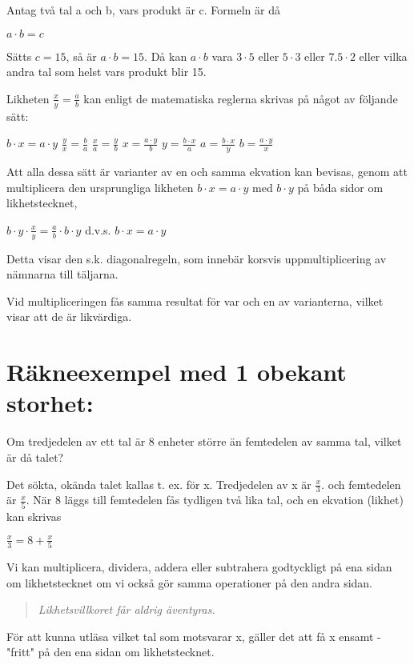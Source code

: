 Antag två tal a och b, vars produkt är c.
Formeln är då

\(a \cdot b = c\)

Sätts \(c = 15\), så är \(a \cdot b = 15\). Då kan \(a \cdot b\) vara \(3 \cdot 5\)
eller \(5 \cdot 3\) eller \(7.5 \cdot 2\) eller vilka andra tal som helst vars
produkt blir 15.

Likheten \(\frac{x}{y} = \frac{a}{b}\) kan enligt de matematiska reglerna skrivas
på något av följande sätt:

\(b \cdot x = a \cdot y\) \(\frac{y}{x} = \frac{b}{a}\) \(\frac{x}{a} = \frac{y}{b}\) \(x = \frac{a \cdot y}{b}\)
\(y = \frac{b \cdot x}{a}\) \(a = \frac{b \cdot x}{y}\) \(b = \frac{a \cdot y}{x}\)

Att alla dessa sätt är varianter av en och samma ekvation kan bevisas, genom att
multiplicera den ursprungliga likheten \(b \cdot x = a \cdot y\) med \(b \cdot y\)
på båda sidor om likhetstecknet,

\(b \cdot y \cdot \frac{x}{y} = \frac{a}{b} \cdot b \cdot y\) d.v.s. \(b \cdot x = a \cdot y\)

Detta visar den s.k. diagonalregeln, som innebär korsvis uppmultiplicering av
nämnarna till täljarna.

Vid multipliceringen fås samma resultat för var och en av varianterna, vilket
visar att de är likvärdiga.

\section{Räkneexempel med 1 obekant storhet:}
Om tredjedelen av ett tal är 8 enheter större än femtedelen av samma tal, vilket
är då talet?

Det sökta, okända talet kallas t. ex. för x. Tredjedelen av x är \(\frac{x}{3}\). och femtedelen är \(\frac{x}{5}\).
När 8 läggs till femtedelen fås tydligen två lika tal, och en ekvation (likhet)
kan skrivas

\(\frac{x}{3}=8 + \frac{x}{5}\)

Vi kan multiplicera, dividera, addera eller subtrahera godtyckligt på ena sidan
om likhetstecknet om vi också gör samma operationer på den andra sidan.

\begin{quote}\emph{
Likhetsvillkoret får aldrig äventyras.
}\end{quote}

För att kunna utläsa vilket tal som motsvarar x, gäller det att få x ensamt - "fritt" på den ena sidan om likhetstecknet.

